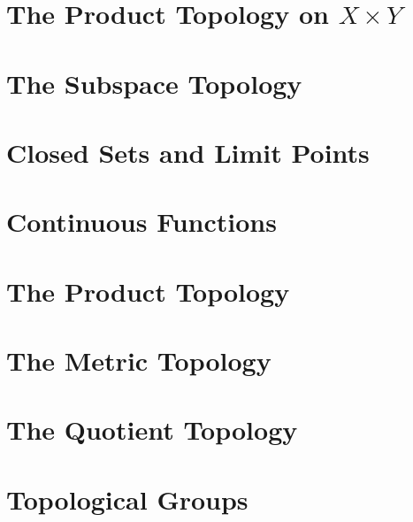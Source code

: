 \documentclass{article}
\begin{document}
\section{The Product Topology on \texorpdfstring{$X\times Y$}{TEXT}}
\newpage

\section{The Subspace Topology}
\newpage

\section{Closed Sets and Limit Points}
\newpage

\section{Continuous Functions}
\newpage

\section{The Product Topology}
\newpage

\section{The Metric Topology}
\newpage

\section{The Quotient Topology}
\newpage

\section{Topological Groups} 
\end{document}
